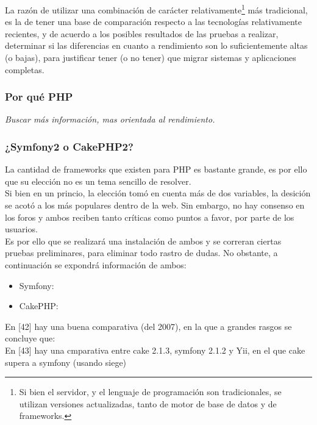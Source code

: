 La razón de utilizar una combinación de carácter relativamente\footnote{Si bien el servidor, y el lenguaje 
de programación son tradicionales, se utilizan versiones actualizadas, tanto de motor de base de datos y de 
frameworks.} más tradicional, es la de tener una base de comparación respecto a las tecnologías relativamente 
recientes, y de acuerdo a los posibles resultados de las pruebas a realizar, determinar si las diferencias 
en cuanto a rendimiento son lo suficientemente altas (o bajas), para justificar tener (o no tener) que 
migrar sistemas y aplicaciones completas.\\


\subsubsection{Por qué PHP}
\textit{Buscar más información, mas orientada al rendimiento.}


\subsubsection{¿Symfony2 o CakePHP2?}

La cantidad de frameworks que existen para PHP es bastante grande, es por ello que su elección no es un
tema sencillo de resolver.\\

Si bien en un princio, la elección tomó en cuenta más de dos variables, la desición se acotó a los más
populares dentro de la web. Sin embargo, no hay consenso en los foros y ambos reciben tanto críticas como 
puntos a favor, por parte de los usuarios.\\

Es por ello que se realizará una instalación de ambos y se correran ciertas pruebas preliminares, para eliminar
todo rastro de dudas. No obstante, a continuación  se expondrá información de ambos:

\begin{itemize}
 \item Symfony: %
 \item CakePHP: %
\end{itemize}

En [42] hay una buena comparativa (del 2007), en la que a grandes rasgos se concluye que:\\
En [43] hay una cmparativa entre cake 2.1.3, symfony 2.1.2 y Yii, en el que cake supera a symfony (usando siege)\\

